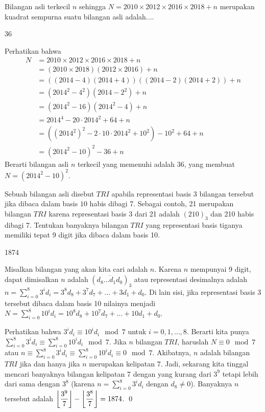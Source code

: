 \documentclass[11pt]{scrartcl}
\begin{document}
	\begin{soalbaru}
		Bilangan asli terkecil $n$ sehingga $N = 2010 \times 2012 \times 2016 \times 2018 + n$ merupakan kuadrat sempurna suatu bilangan asli adalah....
		
		\begin{jawaban}
		36
		\end{jawaban}
		\begin{solusi}
		Perhatikan bahwa \begin{align*}
		N &= 2010 \times 2012 \times 2016 \times 2018 + n\\
		  &= (2010 \times 2018)(2012 \times 2016) + n\\
		  &= ((2014-4)(2014+4))((2014-2)(2014+2))+n\\
		  &= (2014^2-4^2)(2014-2^2)+n\\
		  &= (2014^2-16)(2014^2-4)+n\\
		  &= 2014^4-20 \cdot 2014^2 + 64+n\\
		  &= ((2014^2)^2-2\cdot 10 \cdot 2014^2 + 10^2) -10^2+64+n\\
		  &= (2014^2-10)^2-36+n	  
		\end{align*}Berarti bilangan asli $n$ terkecil yang memenuhi adalah 36, yang membuat $N = (2014^2-10)^2$.
		\end{solusi}
	\end{soalbaru}
	
	\begin{soalbaru}
		Sebuah bilangan asli disebut $TRI$ apabila representasi basis $3$ bilangan tersebut jika dibaca dalam basis $10$ habis dibagi 7. Sebagai contoh, 21 merupakan bilangan $TRI$ karena representasi basis 3 dari 21 adalah $(210)_3$ dan 210 habis dibagi 7. Tentukan banyaknya bilangan $TRI$ yang representasi basis tiganya memiliki tepat 9 digit jika dibaca dalam basis 10.
		
		\begin{jawaban}
		1874
		\end{jawaban}
		\begin{solusi}
		Misalkan bilangan yang akan kita cari adalah $n$. Karena $n$ mempunyai 9 digit, dapat dimisalkan $n$ adalah $(\overline{d_{8}\dots d_1 d_0})_3$ atau representasi desimalnya adalah $n = \sum_{i=0}^{8} 3^id_i = 3^8d_8+3^{7}d_{7}+\dots+3d_1+d_0$. Di lain sisi, jika representasi basis 3 tersebut dibaca dalam basis 10 nilainya menjadi $N = \sum_{i=0}^{8} 10^id_i = 10^8d_8+10^{7}d_{7}+\dots+10d_1+d_0$.
		
		Perhatikan bahwa $3^id_i \equiv 10^id_i \mod 7$ untuk $i=0,1,\dots,8$. Berarti kita punya $\sum_{i=0}^{8} 3^id_i \equiv \sum_{i=0}^{8} 10^id_i \mod 7$. Jika $n$ bilangan $TRI$, haruslah $N \equiv 0 \mod 7$ atau $n\equiv\sum_{i=0}^{8} 3^id_i \equiv \sum_{i=0}^{8} 10^id_i \equiv 0 \mod 7$. Akibatnya, $n$ adalah bilangan $TRI$ jika dan hanya jika $n$ merupakan kelipatan $7$. Jadi, sekarang kita tinggal mencari banyaknya bilangan kelipatan 7 dengan yang kurang dari $3^9$ tetapi lebih dari sama dengan $3^8$ (karena $n = \sum_{i=0}^{8} 3^id_i$ dengan $d_8 \neq 0$). Banyaknya $n$ tersebut adalah $\left\lfloor \dfrac{3^9}{7} \right\rfloor-\left\lfloor \dfrac{3^8}{7} \right\rfloor=1874$. \qed
		\end{solusi}
	\end{soalbaru}
	
\end{document}

